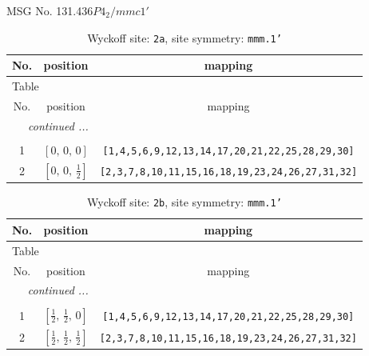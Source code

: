 \documentclass[fleqn,8pt]{jsarticle}
\begin{document}
\setcounter{MaxMatrixCols}{32}

\renewcommand{\tablename}{Table~}
\renewcommand{\figurename}{Figure~}
\begin{center}
\LARGE
MSG No. 131.436\quad$P4_{2}/mmc1'$
\end{center}
\renewcommand{\arraystretch}{1.2}
\begin{longtable}{ccc}
\caption{Wyckoff site: {\tt 2a}, site symmetry: {\tt mmm.1'}}
 \\
 \hline \hline
No. & position & mapping \\ \hline \endfirsthead

\multicolumn{2}{l}{\tablename\ \thetable{}} \\
 \hline \hline
No. & position & mapping \\ \hline \endhead

 \hline \hline
\multicolumn{2}{r}{\footnotesize\it continued ...} \\ \endfoot

 \hline \hline
\multicolumn{2}{r}{} \\ \endlastfoot

1 & $\left[ 0,\, 0,\, 0 \right]$ & {\tt [1,4,5,6,9,12,13,14,17,20,21,22,25,28,29,30]} \\ \hline
2 & $\left[ 0,\, 0,\, \frac{1}{2} \right]$ & {\tt [2,3,7,8,10,11,15,16,18,19,23,24,26,27,31,32]} \\
\end{longtable}
\renewcommand{\arraystretch}{1.2}
\begin{longtable}{ccc}
\caption{Wyckoff site: {\tt 2b}, site symmetry: {\tt mmm.1'}}
 \\
 \hline \hline
No. & position & mapping \\ \hline \endfirsthead

\multicolumn{2}{l}{\tablename\ \thetable{}} \\
 \hline \hline
No. & position & mapping \\ \hline \endhead

 \hline \hline
\multicolumn{2}{r}{\footnotesize\it continued ...} \\ \endfoot

 \hline \hline
\multicolumn{2}{r}{} \\ \endlastfoot

1 & $\left[ \frac{1}{2},\, \frac{1}{2},\, 0 \right]$ & {\tt [1,4,5,6,9,12,13,14,17,20,21,22,25,28,29,30]} \\ \hline
2 & $\left[ \frac{1}{2},\, \frac{1}{2},\, \frac{1}{2} \right]$ & {\tt [2,3,7,8,10,11,15,16,18,19,23,24,26,27,31,32]} \\
\end{longtable}
\end{document}
